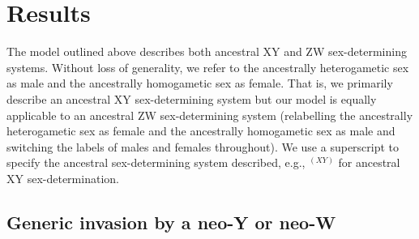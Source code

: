 \documentclass[10pt,letterpaper]{article}
\begin{document}
\section*{Results}

The model outlined above describes both ancestral XY and ZW sex-determining systems. %
Without loss of generality, we refer to the ancestrally heterogametic sex as male and the ancestrally homogametic sex as female.
That is, we primarily describe an ancestral XY sex-determining system but our model is equally applicable to an ancestral ZW sex-determining system (relabelling the ancestrally heterogametic sex as female and the ancestrally homogametic sex as male and switching the labels of males and females throughout). 
We use a superscript to specify the ancestral sex-determining system described, e.g., $^{(XY)}$ for ancestral XY sex-determination.

\subsection*{Generic invasion by a neo-Y or neo-W}
\end{document}
